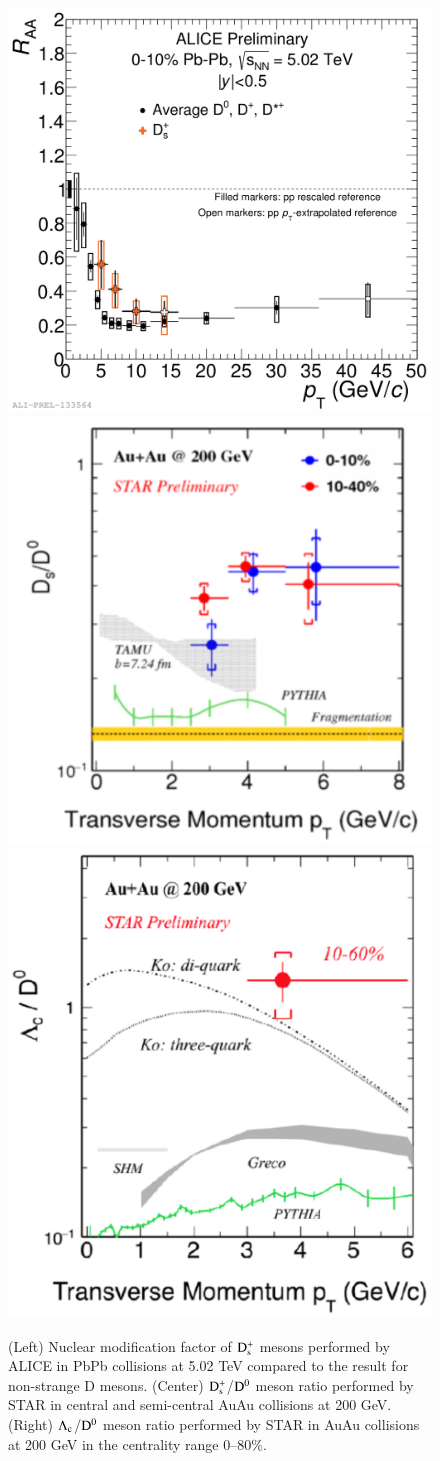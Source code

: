 \documentclass{webofc}
\begin{document}
\begin{figure}[ht]
\centering
\includegraphics[width=.33\textwidth]{Plots/DsDRAA502TeV}
\includegraphics[width=.32\textwidth]{Plots/DsDSTARAuAu}
\includegraphics[width=.32\textwidth]{Plots/LambdacRAASTAR}
\caption{(Left) Nuclear modification factor of $\rm D_{s}^{+}$ mesons performed by ALICE in PbPb collisions at 5.02 TeV compared to the result for non-strange D mesons. 
(Center) $\rm D_{s}^{+}$/$\rm D^{0}$ meson ratio performed by STAR in central and semi-central AuAu collisions at 200 GeV. (Right) $\rm \Lambda_{c}$/$\rm D^{0}$ meson ratio performed by 
STAR in AuAu collisions at 200 GeV in the centrality range 0--80$\%$. }
\label{recombinationMesons}     
\end{figure}
\end{document}
